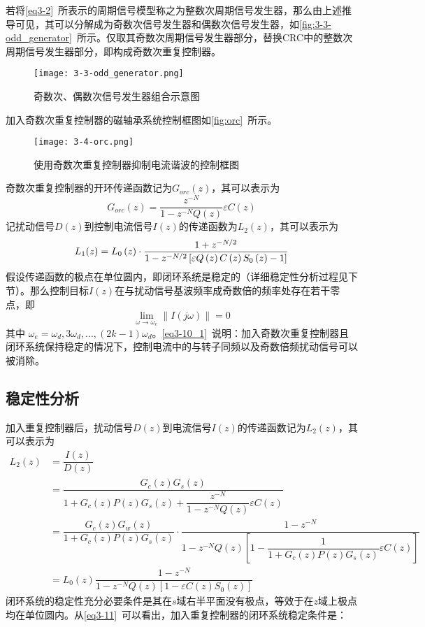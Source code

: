 \documentclass[
  lang=cn,
  degree=master,
  openany,oneside
]{nuaathesis}
\begin{document}
若将\autoref{eq3-2}~所表示的周期信号模型称之为整数次周期信号发生器，那么由上述推导可见，其可以分解成为奇数次信号发生器和偶数次信号发生器，如\autoref{fig:3-3-odd_generator}~所示。仅取其奇数次周期信号发生器部分，替换CRC中的整数次周期信号发生器部分，即构成奇数次重复控制器。
\begin{figure}
	\texttt{[image: 3-3-odd\_generator.png]}
	\caption{奇数次、偶数次信号发生器组合示意图}
	\label{fig:3-3-odd_generator}
\end{figure}
加入奇数次重复控制器的磁轴承系统控制框图如\autoref{fig:orc}~所示。
\begin{figure}[h!]
	\texttt{[image: 3-4-orc.png]}
	\caption{使用奇数次重复控制器抑制电流谐波的控制框图}
	\label{fig:orc}
\end{figure}
奇数次重复控制器的开环传递函数记为$G_{orc}(z)$，其可以表示为
\begin{equation}
G_{orc}(z)=\dfrac{z^{-N}}{1-z^{-N}Q(z)}\varepsilon C(z)
\end{equation}
记扰动信号$D(z)$到控制电流信号$I(z)$的传递函数为$L_2(z)$，其可以表示为
\begin{equation}
L_1(z)={L_0}\left( z \right) \cdot {{1 + {z^{ - N/2}}} \over {1 - {z^{ - N/2}}\left[ {\varepsilon Q\left( z \right)C\left( z \right){S_0}\left( z \right) - 1} \right]}}
\end{equation}
假设传递函数的极点在单位圆内，即闭环系统是稳定的（详细稳定性分析过程见下节）。那么控制目标$I(z)$在与扰动信号基波频率成奇数倍的频率处存在若干零点，即
\begin{equation}
\label{eq3-10_1}
\mathop {\lim }\limits_{\omega  \to {\omega _e}} \left\| {I\left( {j\omega } \right)} \right\| = 0
\end{equation}
其中 $\omega _e=\omega _d, 3\omega _d,...,(2k-1)\omega _d$。\autoref{eq3-10_1}~说明：加入奇数次重复控制器且闭环系统保持稳定的情况下，控制电流中的与转子同频以及奇数倍频扰动信号可以被消除。
\subsection{稳定性分析}
加入重复控制器后，扰动信号$D(z)$到电流信号$I(z)$的传递函数记为$L_2(z)$，其可以表示为
\begin{equation}
\label{eq3-11}
\begin{aligned}
L_2(z)
&=\dfrac{I(z)}{D(z)}\\
&=\dfrac{G_c(z)G_s(z)}{1+G_c(z)P(z)G_s(z)+\dfrac{z^{-N}}{1-z^{-N}Q(z)}\varepsilon C(z)}\\
&=\dfrac{G_c(z)G_w(z)}{1+G_c(z)P(z)G_s(z)}\cdot \dfrac{1-z^{-N}}{1-z^{-N}Q(z)\left[1-\dfrac{1}{1+G_c(z)P(z)G_s(z)}\varepsilon C(z)\right]}\\
&=L_0(z)\dfrac{1-z^{-N}}{1-z^{-N}Q(z)[1-\varepsilon C(z)S_0(z)]}
\end{aligned}
\end{equation}
闭环系统的稳定性充分必要条件是其在$s$域右半平面没有极点，等效于在$z$域上极点均在单位圆内。从\autoref{eq3-11}~可以看出，加入重复控制器的闭环系统稳定条件是：
\end{document}
